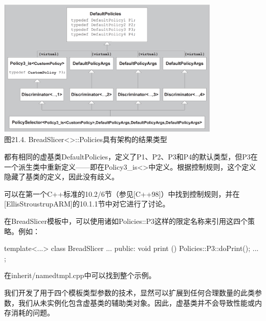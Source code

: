 \begin{center}
\includegraphics[width=0.8\textwidth]{part3/ch21/images/4.png} \\
图21.4. BreadSlicer<>::Policies具有架构的结果类型
\end{center}

都有相同的虚基类DefaultPolicies，定义了P1、P2、P3和P4的默认类型，但P3在一个派生类中重新定义——即在Policy3\_is<>中定义。根据控制规则，这个定义隐藏了基类的定义，因此没有歧义。

\begin{notice}
可以在第一个C++标准的10.2/6节（参见[C++98]）中找到控制规则，并在[EllisStroustrupARM]的10.1.1节中对它进行了讨论。
\end{notice}

在BreadSlicer模板中，可以使用诸如Policies::P3这样的限定名称来引用这四个策略。例如：

\begin{cpp}
template<...>
class BreadSlicer {
	...
	public:
	void print () {
		Policies::P3::doPrint();
	}
	...
};
\end{cpp}

在inherit/namedtmpl.cpp中可以找到整个示例。

我们开发了用于四个模板类型参数的技术，显然可以扩展到任何合理数量的此类参数，我们从未实例化包含虚基类的辅助类对象。因此，虚基类并不会导致性能或内存消耗的问题。






